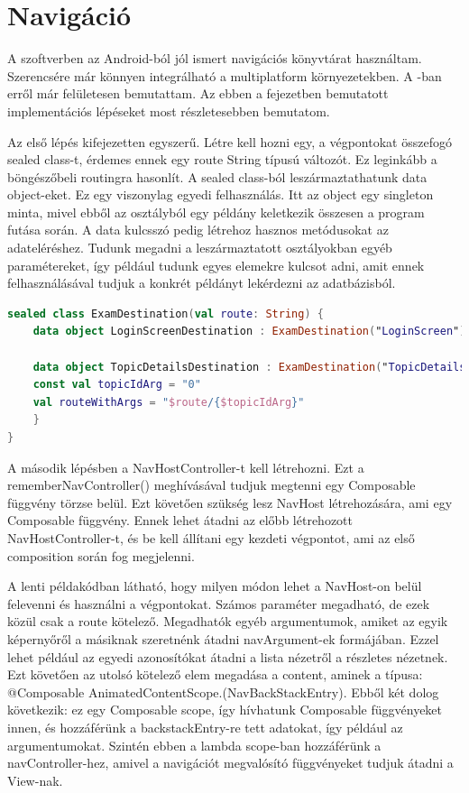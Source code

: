 \section{Navigáció}
\label{sec:Nav}

A szoftverben az Android-ból jól ismert navigációs könyvtárat használtam.
Szerencsére már könnyen integrálható a multiplatform környezetekben.
A -ban erről már felületesen bemutattam.
Az ebben a fejezetben bemutatott implementációs lépéseket most részletesebben bemutatom.

Az első lépés kifejezetten egyszerű.
Létre kell hozni egy, a végpontokat összefogó sealed class-t, érdemes ennek egy route String típusú változót.
Ez leginkább a böngészőbeli routingra hasonlít.
A sealed class-ból leszármaztathatunk data object-eket. Ez egy viszonylag egyedi felhasználás.
Itt az object egy singleton minta, mivel ebből az osztályból egy példány keletkezik összesen a program futása során.
A data kulcsszó pedig létrehoz hasznos metódusokat az adateléréshez.
Tudunk megadni a leszármaztatott osztályokban egyéb paramétereket, így például tudunk egyes elemekre kulcsot adni, amit ennek felhasználásával tudjuk a konkrét példányt lekérdezni az adatbázisból.

\begin{lstlisting}[caption={Példa a végpontok felvételére.}, label={lst:NavDestExample}, language=Kotlin]
sealed class ExamDestination(val route: String) {
    data object LoginScreenDestination : ExamDestination("LoginScreen")

    data object TopicDetailsDestination : ExamDestination("TopicDetails") {
    const val topicIdArg = "0"
    val routeWithArgs = "$route/{$topicIdArg}"
    }
}        
\end{lstlisting}

A második lépésben a NavHostController-t kell létrehozni. Ezt a rememberNavController() meghívásával tudjuk megtenni egy Composable függvény törzse belül.
Ezt követően szükség lesz NavHost létrehozására, ami egy Composable függvény.
Ennek lehet átadni az előbb létrehozott NavHostController-t, és be kell állítani egy kezdeti végpontot, ami az első composition során fog megjelenni.

A lenti példakódban látható, hogy milyen módon lehet a NavHost-on belül felevenni és használni a végpontokat.
Számos paraméter megadható, de ezek közül csak a route kötelező.
Megadhatók egyéb argumentumok, amiket az egyik képernyőről a másiknak szeretnénk átadni navArgument-ek formájában.
Ezzel lehet például az egyedi azonosítókat átadni a lista nézetről a részletes nézetnek.
Ezt követően az utolsó kötelező elem megadása a content, aminek a típusa: @Composable AnimatedContentScope.(NavBackStackEntry).
Ebből két dolog következik: ez egy Composable scope, így hívhatunk Composable függvényeket innen, és hozzáférünk a backstackEntry-re tett adatokat, így például az argumentumokat.
Szintén ebben a lambda scope-ban hozzáférünk a navController-hez, amivel a navigációt megvalósító függvényeket tudjuk átadni a View-nak.

